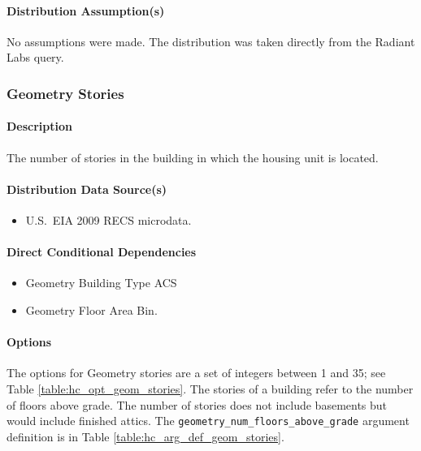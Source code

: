 \paragraph{Distribution Assumption(s)}
No assumptions were made. The distribution was taken directly from the Radiant Labs query.

\subsubsection{Geometry Stories}
\paragraph{Description}
The number of stories in the building in which the housing unit is located.

\paragraph{Distribution Data Source(s)}
\begin{itemize}
    \item U.S.~EIA 2009 RECS microdata.
\end{itemize}

\paragraph{Direct Conditional Dependencies}
\begin{itemize}
    \item Geometry Building Type ACS
    \item Geometry Floor Area Bin.
\end{itemize}

\paragraph{Options}
The options for Geometry stories are a set of integers between 1 and 35; see Table \ref{table:hc_opt_geom_stories}. The stories of a building refer to the number of floors above grade. The number of stories does not include basements but would include finished attics. The \texttt{geometry\_num\_floors\_above\_grade} argument definition is in Table \ref{table:hc_arg_def_geom_stories}.

